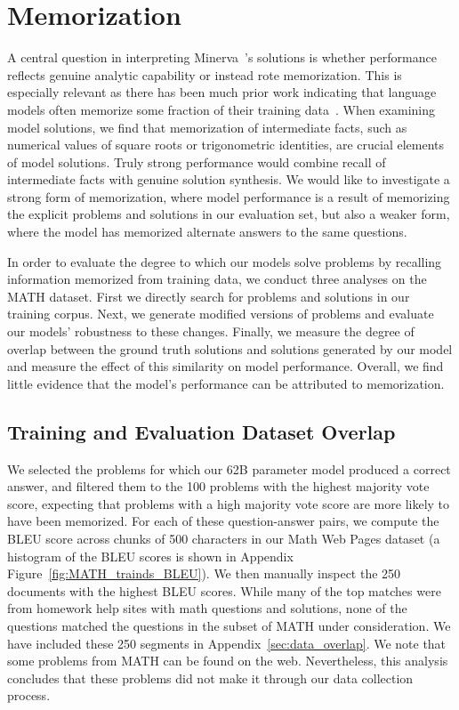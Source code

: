 \section{Memorization}
\label{sec:memorization}
A central question in interpreting {Minerva~}\!\!'s solutions is whether performance reflects genuine analytic capability or instead rote memorization. This is especially relevant as there has been much prior work indicating that language models often memorize some fraction of their training data~\citep{trinh2018simple, radford2019language, carlini_memorization_22}. When examining model solutions, we find that memorization of intermediate facts, such as numerical values of square roots or trigonometric identities, are crucial elements of model solutions. Truly strong performance would combine recall of intermediate facts with genuine solution synthesis. We would like to investigate a strong form of memorization, where model performance is a result of memorizing the explicit problems and solutions in our evaluation set, but also a weaker form, where the model has memorized alternate answers to the same questions.

In order to evaluate the degree to which our models solve problems by recalling information memorized from training data, we conduct three analyses on the MATH dataset. First we directly search for problems and solutions in our training corpus. Next, we generate modified versions of problems and evaluate our models' robustness to these changes. Finally, we measure the degree of overlap between the ground truth solutions and solutions generated by our model and measure the effect of this similarity on model performance. Overall, we find little evidence that the model's performance can be attributed to memorization.

\subsection{Training and Evaluation Dataset Overlap}

We selected the problems for which our 62B parameter model produced a correct answer, and filtered them to the 100 problems with the highest majority vote score, expecting that problems with a high majority vote score are more likely to have been memorized. For each of these question-answer pairs, we compute the BLEU score across chunks of 500 characters in our Math Web Pages dataset (a histogram of the BLEU scores is shown in Appendix Figure~\ref{fig:MATH_trainds_BLEU}).
We then manually inspect the 250 documents with the highest BLEU scores. While many of the top matches were from homework help sites with math questions and solutions, none of the questions matched the questions in the subset of MATH under consideration. We have included these 250 segments in Appendix~\ref{sec:data_overlap}.
We note that some problems from MATH can be found on the web. Nevertheless, this analysis concludes that these problems did not make it through our data collection process.

